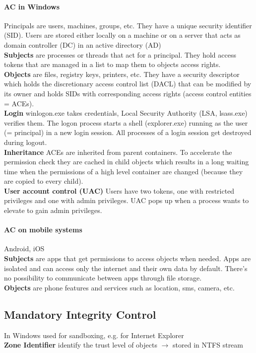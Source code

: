 \documentclass[12pt]{article}
\begin{document}
	\paragraph{AC in Windows} Principals are users, machines, groups, etc. They have a unique security identifier (SID). Users are stored either locally on a machine or on a server that acts as domain controller (DC) in an active directory (AD)\\
	\textbf{Subjects} are processes or threads that act for a principal. They hold access tokens that are managed in a list to map them to objects access rights.\\
	\textbf{Objects} are files, registry keys, printers, etc. They have a security descriptor which holds the discretionary access control list (DACL) that can be modified by its owner and holds SIDs with corresponding access rights (access control entities = ACEs).\\
	\textbf{Login} winlogon.exe takes credentials, Local Security Authority (LSA, lsass.exe) verifies them. The logon process starts a shell (explorer.exe) running as the user (= principal) in a new login session. All processes of a login session get destroyed during logout.\\
	\textbf{Inheritance} ACEs are inherited from parent containers. To accelerate the permission check they are cached in child objects which results in a long waiting time when the permissions of a high level container are changed (because they are copied to every child).\\
	\textbf{User account control (UAC)} Users have two tokens, one with restricted privileges and one with admin privileges. UAC pops up when a process wants to elevate to gain admin privileges.
	
	\paragraph{AC on mobile systems} Android, iOS\\
	\textbf{Subjects} are apps that get permissions to access objects when needed. Apps are isolated and can access only the internet and their own data by default. There's no possibility to communicate between apps through file storage.\\
	\textbf{Objects} are phone features and services such as location, sms, camera, etc.
	
	\subsection{Mandatory Integrity Control}
	In Windows used for sandboxing, e.g. for Internet Explorer\\
	\textbf{Zone Identifier} identify the trust level of objects $\rightarrow$ stored in NTFS stream
	
\end{document}
